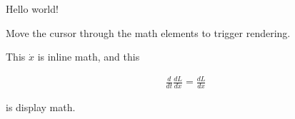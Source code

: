 \documentclass{article}
\begin{document}
Hello world!

Move the cursor through the math elements to trigger rendering.

This $\dot{x}$ is inline math, and this

\begin{align*}
\frac{d}{dt}\frac{dL}{d\dot{x}} = \frac{dL}{dx}
\end{align*}

is display math.
\end{document}

